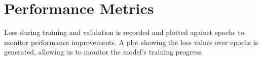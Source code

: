 \section{Performance Metrics}
Loss during training and validation is recorded and plotted against epochs to monitor performance improvements. A plot showing the loss values over epochs is generated, allowing us to monitor the model's training progress.
\begin{figure}[hbt!]
\end{figure}

